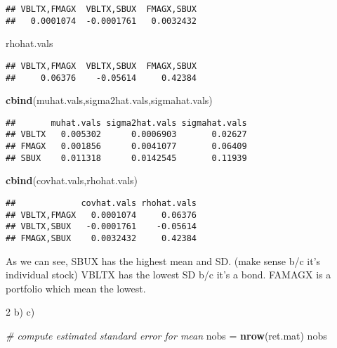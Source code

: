 \documentclass[]{article}
\newenvironment{Shaded}{\begin{snugshade}}{\end{snugshade}}
\newcommand{\KeywordTok}[1]{\textcolor[rgb]{0.13,0.29,0.53}{\textbf{#1}}}
\newcommand{\StringTok}[1]{\textcolor[rgb]{0.31,0.60,0.02}{#1}}
\newcommand{\CommentTok}[1]{\textcolor[rgb]{0.56,0.35,0.01}{\textit{#1}}}
\newcommand{\NormalTok}[1]{#1}
\begin{document}
\begin{verbatim}
## VBLTX,FMAGX  VBLTX,SBUX  FMAGX,SBUX 
##   0.0001074  -0.0001761   0.0032432
\end{verbatim}

\begin{Shaded}
\begin{Highlighting}[]
\NormalTok{rhohat.vals}
\end{Highlighting}
\end{Shaded}

\begin{verbatim}
## VBLTX,FMAGX  VBLTX,SBUX  FMAGX,SBUX 
##     0.06376    -0.05614     0.42384
\end{verbatim}

\begin{Shaded}
\begin{Highlighting}[]
\KeywordTok{cbind}\NormalTok{(muhat.vals,sigma2hat.vals,sigmahat.vals)}
\end{Highlighting}
\end{Shaded}

\begin{verbatim}
##       muhat.vals sigma2hat.vals sigmahat.vals
## VBLTX   0.005302      0.0006903       0.02627
## FMAGX   0.001856      0.0041077       0.06409
## SBUX    0.011318      0.0142545       0.11939
\end{verbatim}

\begin{Shaded}
\begin{Highlighting}[]
\KeywordTok{cbind}\NormalTok{(covhat.vals,rhohat.vals)}
\end{Highlighting}
\end{Shaded}

\begin{verbatim}
##             covhat.vals rhohat.vals
## VBLTX,FMAGX   0.0001074     0.06376
## VBLTX,SBUX   -0.0001761    -0.05614
## FMAGX,SBUX    0.0032432     0.42384
\end{verbatim}

As we can see, SBUX has the highest mean and SD. (make sense b/c it's
individual stock) VBLTX has the lowest SD b/c it's a bond. FAMAGX is a
portfolio which mean the lowest.

2 b) c)

\begin{Shaded}
\begin{Highlighting}[]
\CommentTok{# compute estimated standard error for mean}
\NormalTok{nobs =}\StringTok{ }\KeywordTok{nrow}\NormalTok{(ret.mat)}
\NormalTok{nobs}
\end{Highlighting}
\end{Shaded}
\end{document}
